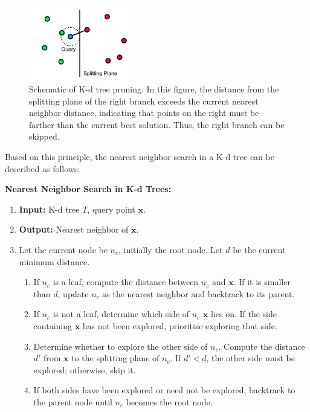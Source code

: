 \begin{figure}[!htp]
	\centering
	\includegraphics[width=0.4\textwidth]{resources/basic-point-cloud/kdtree-split-plane.pdf}
	\caption{Schematic of K-d tree pruning. In this figure, the distance from the splitting plane of the right branch exceeds the current nearest neighbor distance, indicating that points on the right must be farther than the current best solution. Thus, the right branch can be skipped.}
	\label{fig:kdtree-split-plane}
\end{figure}

Based on this principle, the nearest neighbor search in a K-d tree can be described as follows:

\begin{mdframed}
	\textbf{Nearest Neighbor Search in K-d Trees:}
	\begin{enumerate}
		\item \textbf{Input:} K-d tree \(T\), query point \(\mathbf{x}\).
		\item \textbf{Output:} Nearest neighbor of \(\mathbf{x}\).
		\item Let the current node be \(n_c\), initially the root node. Let \(d\) be the current minimum distance.
		\begin{enumerate}
			\item If \(n_c\) is a leaf, compute the distance between \(n_c\) and \(\mathbf{x}\). If it is smaller than \(d\), update \(n_c\) as the nearest neighbor and backtrack to its parent.
			\item If \(n_c\) is not a leaf, determine which side of \(n_c\) \(\mathbf{x}\) lies on. If the side containing \(\mathbf{x}\) has not been explored, prioritize exploring that side.
			\item Determine whether to explore the other side of \(n_c\). Compute the distance \(d'\) from \(\mathbf{x}\) to the splitting plane of \(n_c\). If \(d' < d\), the other side must be explored; otherwise, skip it.
			\item If both sides have been explored or need not be explored, backtrack to the parent node until \(n_c\) becomes the root node.
		\end{enumerate}
	\end{enumerate}
\end{mdframed}

